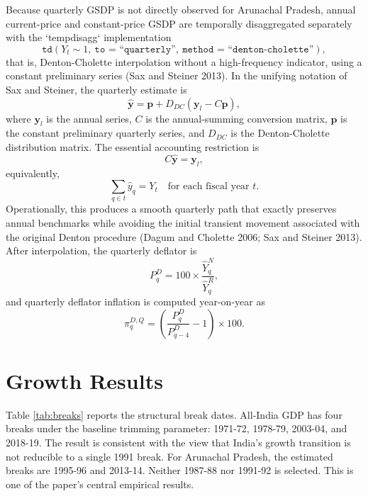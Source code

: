 \documentclass[11pt,a4paper]{article}
\begin{document}
Because quarterly GSDP is not directly observed for Arunachal Pradesh, annual current-price and constant-price GSDP are temporally disaggregated separately with the `tempdisagg` implementation
\begin{equation}
\texttt{td}(Y_t \sim 1,\ \texttt{to = ``quarterly''},\ \texttt{method = ``denton-cholette''}),
\end{equation}
that is, Denton-Cholette interpolation without a high-frequency indicator, using a constant preliminary series (Sax and Steiner 2013). In the unifying notation of Sax and Steiner, the quarterly estimate is
\begin{equation}
\hat{\mathbf y} = \mathbf p + D_{DC}\left(\mathbf y_l - C\mathbf p\right),
\end{equation}
where $\mathbf y_l$ is the annual series, $C$ is the annual-summing conversion matrix, $\mathbf p$ is the constant preliminary quarterly series, and $D_{DC}$ is the Denton-Cholette distribution matrix. The essential accounting restriction is
\begin{equation}
C\hat{\mathbf y} = \mathbf y_l,
\end{equation}
equivalently,
\begin{equation}
\sum_{q \in t}\hat y_q = Y_t \quad \text{for each fiscal year } t.
\end{equation}
Operationally, this produces a smooth quarterly path that exactly preserves annual benchmarks while avoiding the initial transient movement associated with the original Denton procedure (Dagum and Cholette 2006; Sax and Steiner 2013). After interpolation, the quarterly deflator is
\begin{equation}
P^{D}_{q} = 100\times \frac{\hat Y^{N}_{q}}{\hat Y^{R}_{q}},
\end{equation}
and quarterly deflator inflation is computed year-on-year as
\begin{equation}
\pi^{D,Q}_{q} = \left(\frac{P^{D}_{q}}{P^{D}_{q-4}} - 1\right)\times 100.
\end{equation}

\section{Growth Results}

Table \ref{tab:breaks} reports the structural break dates. All-India GDP has four breaks under the baseline trimming parameter: 1971-72, 1978-79, 2003-04, and 2018-19. The result is consistent with the view that India's growth transition is not reducible to a single 1991 break. For Arunachal Pradesh, the estimated breaks are 1995-96 and 2013-14. Neither 1987-88 nor 1991-92 is selected. This is one of the paper's central empirical results.
\end{document}
